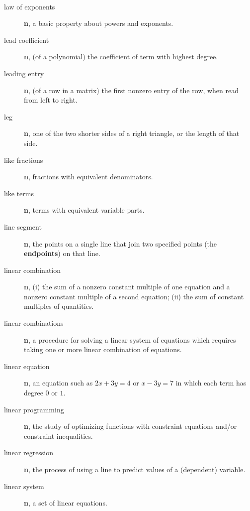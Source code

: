 \documentclass[10pt,]{book}
\newcommand{\terminology}[1]{\textbf{#1}}
\theoremstyle{plain}
\theoremstyle{definition}
\theoremstyle{definition}
\theoremstyle{definition}
\numberwithin{equation}{part}
\begin{document}
\paragraph[{}]{}\hypertarget{paragraphs-15}{}
\leavevmode%
\begin{description}
\item[{law of exponents}]\hypertarget{li-648}{}\terminology{n}, a basic property about powers and exponents.%
\item[{lead coefficient}]\hypertarget{li-649}{}\terminology{n}, (of a polynomial) the coefficient of term with highest degree.%
\item[{leading entry}]\hypertarget{li-650}{}\terminology{n}, (of a row in a matrix) the first nonzero entry of the row, when read from left to right.%
\item[{leg}]\hypertarget{li-651}{}\terminology{n}, one of the two shorter sides of a right triangle, or the length of that side.%
\item[{like fractions}]\hypertarget{li-652}{}\terminology{n}, fractions with equivalent denominators.%
\item[{like terms}]\hypertarget{li-653}{}\terminology{n}, terms with equivalent variable parts.%
\item[{line segment}]\hypertarget{li-654}{}\terminology{n}, the points on a single line that join two specified points (the \terminology{endpoints}) on that line.%
\item[{linear combination}]\hypertarget{li-655}{}\terminology{n}, (i) the sum of a nonzero constant multiple of one equation and a nonzero constant multiple of a second equation; (ii) the sum of constant multiples of quantities.%
\item[{linear combinations}]\hypertarget{li-656}{}\terminology{n}, a procedure for solving a linear system of equations which requires taking one or more linear combination of equations.%
\item[{linear equation}]\hypertarget{li-657}{}\terminology{n}, an equation such as \(2x + 3y = 4\) or \(x − 3y = 7\) in which each term has degree \(0\) or \(1\).%
\item[{linear programming}]\hypertarget{li-658}{}\terminology{n}, the study of optimizing functions with constraint equations and/or constraint inequalities.%
\item[{linear regression}]\hypertarget{li-659}{}\terminology{n}, the process of using a line to predict values of a (dependent) variable.%
\item[{linear system}]\hypertarget{li-660}{}\terminology{n}, a set of linear equations.%

\end{description}
\end{document}
